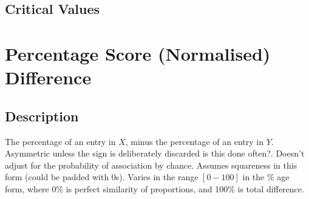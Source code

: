 \documentclass[11pt]{article}
\begin{document}
\subsection{Critical Values}


















\section{Percentage Score (Normalised) Difference}
\label{section:percentage}
\subsection{Description}
The percentage of an entry in $X$, minus the percentage of an entry in $Y$.  
Asymmetric unless the sign is deliberately discarded {\color{red} is this done often?}.  
Doesn't adjust for the probability of association by chance.  
Assumes squareness in this form (could be padded with 0s).  
Varies in the range $[0-100]$ in the \% age form, where 0\% is perfect similarity of proportions, and 100\% is total difference.
\end{document}
